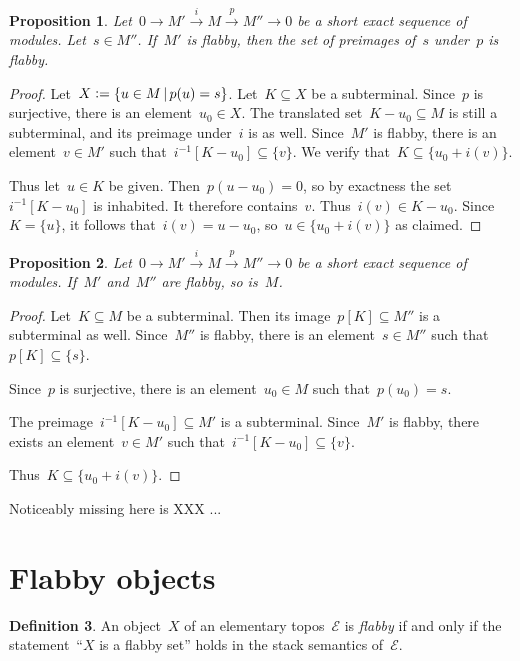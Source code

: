 \documentclass[oneside]{amsart}
\theoremstyle{definition}
\newtheorem{defn}{Definition}[section]
\theoremstyle{plain}
\newtheorem{prop}[defn]{Proposition}
\theoremstyle{remark}
\newcommand{\xra}[1]{\xrightarrow{#1}}
\newcommand{\E}{\mathcal{E}}
\newcommand{\defeq}{\vcentcolon=}
\renewcommand{\_}{\mathpunct{.}\,}
\begin{document}
\begin{prop}\label{prop:set-of-preimages-flabby}
Let~$0 \to M' \xra{i} M \xra{p} M'' \to 0$ be a short exact
sequence of modules. Let~$s \in M''$. If~$M'$ is flabby, then the set of
preimages of~$s$ under~$p$ is flabby.
\end{prop}

\begin{proof}Let~$X \defeq \{ u \in M \,|\, p(u) = s
\}$. Let~$K \subseteq X$ be a subterminal. Since~$p$ is surjective, there is an
element~$u_0 \in X$. The translated set~$K - u_0 \subseteq M$ is still a
subterminal, and its preimage under~$i$ is as well. Since~$M'$ is flabby, there
is an element~$v \in M'$ such that~$i^{-1}[K - u_0] \subseteq \{v\}$. We verify
that~$K \subseteq \{u_0 + i(v)\}$.

Thus let~$u \in K$ be given. Then~$p(u - u_0) = 0$, so by exactness the
set~$i^{-1}[K - u_0]$ is inhabited. It therefore contains~$v$. Thus~$i(v) \in K
- u_0$. Since~$K = \{u\}$, it follows that~$i(v) = u - u_0$, so~$u \in \{u_0 +
i(v)\}$ as claimed.
\end{proof}

\begin{prop}Let~$0 \to M' \xra{i} M \xra{p} M'' \to 0$ be a short exact
sequence of modules. If~$M'$ and~$M''$ are flabby, so is~$M$.
\end{prop}

\begin{proof}Let~$K \subseteq M$ be a subterminal. Then its image~$p[K] \subseteq M''$
is a subterminal as well. Since~$M''$ is flabby, there is an element~$s \in
M''$ such that~$p[K] \subseteq \{ s \}$.

Since~$p$ is surjective, there is an element~$u_0 \in M$ such that~$p(u_0) =
s$.

The preimage~$i^{-1}[K - u_0] \subseteq M'$ is a subterminal. Since~$M'$ is
flabby, there exists an element~$v \in M'$ such that~$i^{-1}[K - u_0] \subseteq
\{v\}$.

Thus~$K \subseteq \{ u_0 + i(v) \}$.
\end{proof}

Noticeably missing here is XXX ...


\section{Flabby objects}

\begin{defn}An object~$X$ of an elementary topos~$\E$ is \emph{flabby} if and
only if the statement~``$X$ is a flabby set'' holds in the stack semantics
of~$\E$.\end{defn}
\end{document}
